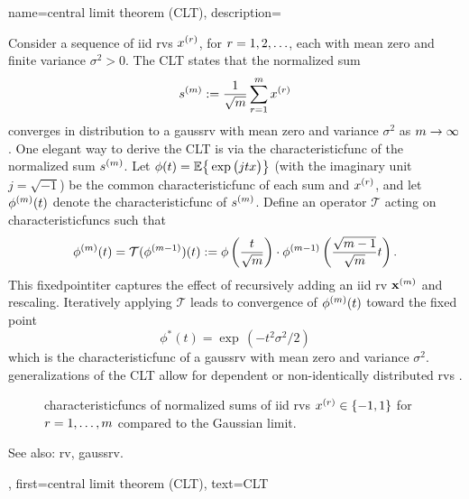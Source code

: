 {{{    	
{name={central limit theorem (CLT)},
	description={Consider a sequence of \gls{iid} \glspl{rv} \( x^{(r)} \), for \( r = 1, 2, \ldots \), 
		each with \gls{mean} zero and finite \gls{variance} \( \sigma^2 > 0 \). 
		The  CLT states that the normalized sum 
		\[
		s^{(m)} := \frac{1}{\sqrt{m}} \sum_{r = 1}^{m} x^{(r)} 
		\]
		converges in distribution to a \gls{gaussrv} with \gls{mean} zero and \gls{variance} \( \sigma^2 \) as \( m \to \infty \) \cite[Proposition~2.17]{AsympVanderVaartBook}.
		One elegant way to derive the CLT is via the \gls{characteristicfunc} of the normalized sum \( s^{(m)} \). 
		Let $ \phi(t) = \mathbb{E} \big\{ \exp \big( j t x \big) \big\}$ (with the imaginary unit $j = \sqrt{-1}$) 
		be the common \gls{characteristicfunc} of each sum and $x^{(r)}$, and let \( \phi^{(m)}(t) \) 
		denote the \gls{characteristicfunc} of \( s^{(m)} \). Define an operator \( \mathcal{T} \) acting on \glspl{characteristicfunc} 
		such that
		\[
		\phi^{(m)}(t) = \mathcal{T}(\phi^{(m-1)})(t) := \phi\left( \frac{t}{\sqrt{m}} \right) \cdot \phi^{(m-1)}\left( \frac{\sqrt{m-1}}{\sqrt{m}} t \right).
		\]
		This \gls{fixedpointiter} captures the effect of recursively adding an \gls{iid} \gls{rv} ${\bf x}^{(m)}$ 
		and rescaling. Iteratively applying \( \mathcal{T} \) leads to convergence of \( \phi^{(m)}(t) \) toward the fixed point
		\[
		\phi^*(t) = \exp\,(-t^2 \sigma^2 / 2)
		\]
		which is the \gls{characteristicfunc} of a \gls{gaussrv} with \gls{mean} zero and \gls{variance} 
		\( \sigma^2 \). \Glspl{generalization} of the CLT allow for dependent or non-identically distributed \glspl{rv} \cite[Sec.~2.8]{AsympVanderVaartBook}.
		\begin{figure}[H]
			\centering
			\caption{\Glspl{characteristicfunc} of normalized sums of \gls{iid} \glspl{rv} $x^{(r)} \in \{-1,1\}$ 
			for $r=1,\ldots,m$ compared to the Gaussian limit.}
		\end{figure}
		See also: \gls{rv}, \gls{gaussrv}.},
	first={central limit theorem (CLT)},
	text={CLT}
}

}}}
